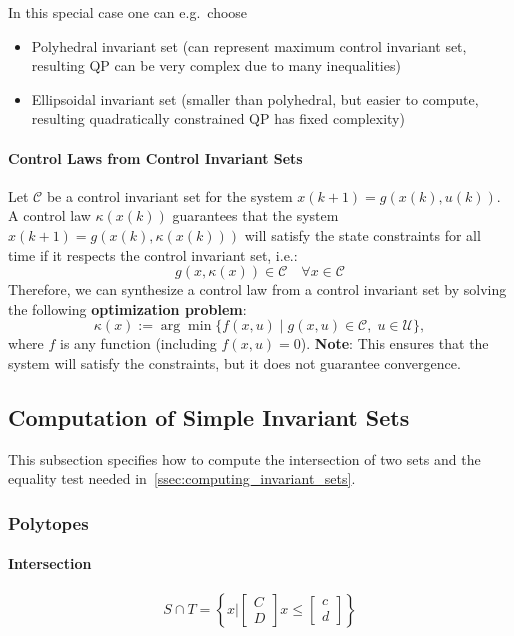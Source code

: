 \newpar{}

In this special case one can e.g.\ choose
\begin{itemize}
    \item Polyhedral invariant set (can represent maximum control invariant set, resulting QP can be very complex due to many inequalities)
    \item Ellipsoidal invariant set (smaller than polyhedral, but easier to compute, resulting quadratically constrained QP has fixed complexity)
\end{itemize}

\paragraph{Control Laws from Control Invariant Sets}

Let $\mathcal{C}$ be a control invariant set for the system $x(k + 1) = g(x(k), u(k))$.
\newpar{}
A control law $\kappa(x(k))$ guarantees that the system $x(k + 1) = g(x(k), \kappa(x(k)))$ will satisfy the state constraints for all time if it respects the control invariant set, i.e.:
\begin{equation*}
    g(x, \kappa(x)) \in \mathcal{C} \quad \forall x \in \mathcal{C}
\end{equation*}
Therefore, we can synthesize a control law from a control invariant set by solving the following \textbf{optimization problem}:
\begin{equation*}
    \kappa(x) := \arg\min \{ f(x, u) \mid g(x, u) \in \mathcal{C},\; u \in \mathcal{U} \},
\end{equation*}
where $f$ is any function (including $f(x, u) = 0$).
\newpar{}
\textbf{Note}: This ensures that the system will satisfy the constraints, but it does not guarantee convergence.

\subsection{Computation of Simple Invariant Sets}
This subsection specifies how to compute the intersection of two sets and the equality test needed in~\ref{ssec:computing_invariant_sets}.
\subsubsection{Polytopes}
\paragraph{Intersection}
\begin{equation*}
    S \cap T = \left\{x \Bigg|\begin{bmatrix}
        C \\D
    \end{bmatrix}x \leq \begin{bmatrix}
        c \\d
    \end{bmatrix}\right\}
\end{equation*}

